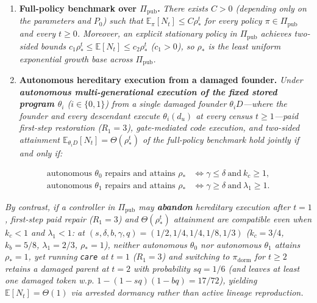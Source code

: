 \documentclass[11pt,a4paper]{article}
\providecommand{\tightlist}{\setlength{\itemsep}{2pt}\setlength{\parskip}{0pt}}
\begin{document}
\begin{enumerate}
\def\labelenumi{\arabic{enumi}.}
\tightlist
\item
  \textbf{Full-policy benchmark over \(\Pi_{\mathrm{pub}}\).}
  \emph{There exists \(C > 0\) (depending only on the parameters and
  \(P_0\)) such that \(\mathbb{E}_\pi[N_t] \le C \rho_*^t\) for every
  policy \(\pi \in \Pi_{\mathrm{pub}}\) and every \(t \ge 0\). Moreover,
  an explicit stationary policy in \(\Pi_{\mathrm{pub}}\) achieves
  two-sided bounds \(c_1 \rho_*^t \le \mathbb{E}[N_t] \le c_2 \rho_*^t\)
  (\(c_1 > 0\)), so \(\rho_*\) is the least uniform exponential growth
  base across \(\Pi_{\mathrm{pub}}\).}
\item
  \textbf{Autonomous hereditary execution from a damaged founder.}
  \emph{Under \textbf{autonomous multi-generational execution of the
  fixed stored program \(\theta_i\)} (\(i \in \{0,1\}\)) from a single
  damaged founder \(\theta_i D\)---where the founder and every
  descendant execute \(\theta_i(d_u)\) at every census
  \(t \ge 1\)---paid first-step restoration (\(R_1 = 3\)), gate-mediated
  code execution, and two-sided attainment
  \(\mathbb{E}_{\theta_i D}[N_t] = \Theta(\rho_*^t)\) of the full-policy
  benchmark hold jointly if and only if:}
\end{enumerate}

\[\begin{aligned}
\text{autonomous }\theta_0\text{ repairs and attains }\rho_* &\iff \gamma \le \delta \ \text{and}\ k_c \ge 1,\\
\text{autonomous }\theta_1\text{ repairs and attains }\rho_* &\iff \gamma \ge \delta \ \text{and}\ \lambda_1 \ge 1.
\end{aligned}\]

\emph{By contrast, if a controller in \(\Pi_{\mathrm{pub}}\) may
\textbf{abandon} hereditary execution after \(t=1\), first-step paid
repair (\(R_1 = 3\)) and \(\Theta(\rho_*^t)\) attainment are compatible
even when \(k_c < 1\) and \(\lambda_1 < 1\): at
\((s,\delta,b,\gamma,q) = (1/2, 1/4, 1/4, 1/8, 1/3)\) (\(k_c = 3/4\),
\(k_b = 5/8\), \(\lambda_1 = 2/3\), \(\rho_* = 1\)), neither autonomous
\(\theta_0\) nor autonomous \(\theta_1\) attains \(\rho_* = 1\), yet
running \texttt{care} at \(t=1\) (\(R_1 = 3\)) and switching to
\(\pi_{\mathrm{dorm}}\) for \(t \ge 2\) retains a damaged parent at
\(t=2\) with probability \(s q = 1/6\) (and leaves at least one damaged
token w.p. \(1 - (1-sq)(1-bq) = 17/72\)), yielding
\(\mathbb{E}[N_t] = \Theta(1)\) via arrested dormancy rather than active
lineage reproduction.}
\end{document}
